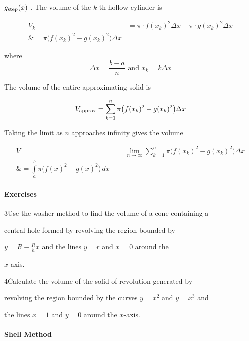 $g _{\rm step}(x)$ . The volume of the $k$-th hollow cylinder is



\begin{align}
V _k &= \pi\cdot f(x _k)^2\Delta x - \pi\cdot g(x _k)^2\Delta x \\\&= \pi\bigl(f(x _k)^2 - g(x _k)^2\bigr)\Delta x
\end{align}

where $$\Delta x=\frac{b-a}{n} \text{ and } x _k=k\Delta x$$ 

The volume of the entire approximating solid is



$$V _{\rm approx}=\sum _{k=1}^n \pi\bigl(f(x _k)^2-g(x _k)^2\bigr)\Delta x$$

Taking the limit as $n$ approaches infinity gives the volume



\begin{align}
V &= \lim _{n\to\infty}\sum _{k=1}^n \pi\bigl(f(x _k)^2 - g(x _k)^2\bigr)\Delta x \\\&= \int\limits_a^b \pi\bigl(f(x)^2 - g(x)^2\bigr)\,dx
\end{align}



\paragraph{Exercises}



3\. Use the washer method to find the volume of a cone containing a

    central hole formed by revolving the region bounded by

    $y=R-\frac{R}{h}x$ and the lines $y=r$ and $x=0$ around the

    $x$-axis.





4\. Calculate the volume of the solid of revolution generated by

    revolving the region bounded by the curves $y=x^2$ and $y=x^3$ and

    the lines $x=1$ and $y=0$ around the $x$-axis.



\paragraph{Shell Method}



